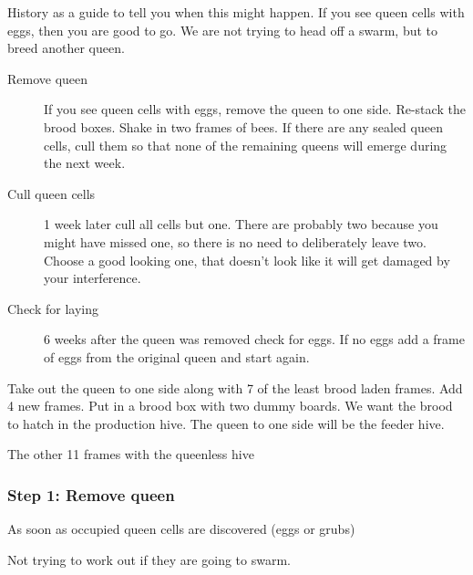 History as a guide to tell you when this might happen.
If you see queen cells with eggs,
then you are good to go.
We are not trying to head off a swarm,
but to breed another queen.

\begin{description}
  \item[Remove queen] If you see queen cells with eggs, remove the queen to one side.
    Re-stack the brood boxes.
    Shake in two frames of bees.
    If there are any sealed queen cells, cull them so that none of the remaining queens will emerge during the next week.
  \item[Cull queen cells] 1 week later cull all cells but one.
    There are probably two because you might have missed one, so there is no need to deliberately leave two.
    Choose a good looking one,
    that doesn't look like it will get damaged by your interference.
  \item[Check for laying] 6 weeks after the queen was removed check for eggs.
    If no eggs add a frame of eggs from the original queen
    and start again. 
\end{description}

Take out the queen to one side along with 7 of the least brood laden frames.  
Add 4 new frames.
Put in a brood box with two dummy boards.
We want the brood to hatch in the production hive.
The queen to one side will be the feeder hive.

The other 11 frames with the queenless hive

\subsubsection*{Step 1: Remove queen}

As soon as occupied queen cells are discovered (eggs or grubs)

Not trying to work out if they are going to swarm.

